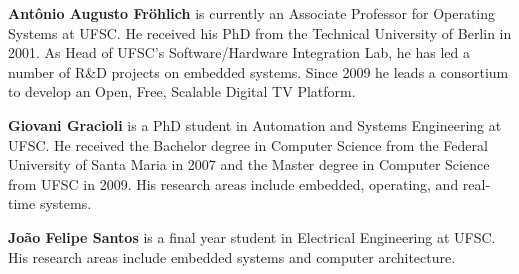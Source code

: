 \documentclass[final,3pd,times]{elsarticle}
\begin{document}

\begin{description}
\item \textbf{Ant\^{o}nio Augusto Fr\"{o}hlich} is currently an
  Associate Professor for Operating Systems at UFSC. He received his PhD
  from the Technical University of Berlin in 2001. As Head of UFSC's
  Software/Hardware Integration Lab, he has led a number of R\&D
  projects on embedded systems. Since 2009 he leads a consortium to
  develop an Open, Free, Scalable Digital TV Platform.  \linebreak

\item \textbf{Giovani Gracioli} is a PhD student in Automation and
  Systems Engineering at UFSC. He received the Bachelor degree in
  Computer Science from the Federal University of Santa Maria in 2007
  and the Master degree in Computer Science from UFSC in 2009. His
  research areas include embedded, operating, and real-time systems.
  \linebreak

\item \textbf{Jo\~{a}o Felipe Santos} is a final year student in
  Electrical Engineering at UFSC. His research areas include embedded
  systems and computer architecture.

\end{description}
\end{document}
